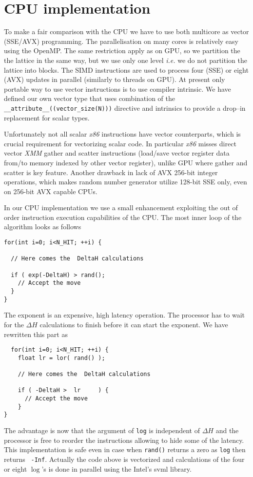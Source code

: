 \documentclass[a4paper]{llncs}
\newcommand{\code}[1]{\lstinline!#1!}
\begin{document}
\section{CPU implementation}


To make a fair comparison with the CPU we have to use both multicore
as vector (SSE/AVX) programming.  The parallelisation on many cores is
relatively easy using the OpenMP. The same restriction apply as on
GPU, so we partition the the lattice in the same way, but we use only
one level {\em i.e.} we do not partition the lattice into blocks.  The
SIMD instructions are used to process four (SSE) or eight (AVX)
updates in parallel (similarly to threads on GPU).  At present only
portable way to use vector instructions is to use compiler
intrinsic\cite{intr}. We have defined our own vector type that uses
combination of the \lstinline!__attribute__((vector_size(N)))!
directive and intrinsics to provide a drop--in replacement for scalar
types.

Unfortunately not all scalar \emph{x86} instructions have vector counterparts,
which is crucial requirement for vectorizing scalar code. In particular
\emph{x86} misses direct vector \emph{XMM} gather and scatter instructions
(load/save vector register data from/to memory indexed by other vector
register), unlike GPU where gather and scatter is key feature. Another drawback
in lack of AVX 256-bit integer operations, which makes random number generator
utilize 128-bit SSE only, even on 256-bit AVX capable CPUs.

In our CPU implementation we use a small enhancement exploiting the
out of order instruction execution capabilities of the CPU. The most
inner loop of the algorithm looks as follows
\begin{lstlisting}
for(int i=0; i<N_HIT; ++i) {

  // Here comes the  DeltaH calculations 
 
  if ( exp(-DeltaH) > rand();
    // Accept the move
  }
}
\end{lstlisting}
The exponent is an expensive, high latency operation. The processor
has to wait for the $\Delta H$ calculations to finish before it can
start the exponent. We have rewritten this part as
\begin{lstlisting}
  for(int i=0; i<N_HIT; ++i) { 
    float lr = lor( rand() );
 
    // Here comes the  DeltaH calculations 
 
    if ( -DeltaH >  lr     ) {
      // Accept the move 
    }
}
\end{lstlisting}
The advantage is now that the argument of \code{log} is independent of
$\Delta H$ and the processor is free to reorder the instructions
allowing to hide some of the latency. This implementation is safe even
in case when \code{rand()} returns a zero as \code{log} then returns {\tt
  -Inf}.  Actually the code above is vectorized and calculations of
the four or eight $\log$'s is done in parallel  using the Intel's svml
library\cite{svml}.
\end{document}
